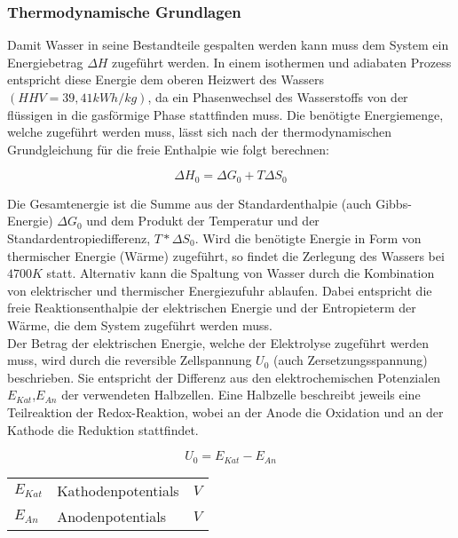 \documentclass[onecolumn,10pt,titlepage]{article}
\begin{document}
\subsubsection{Thermodynamische Grundlagen}
\label{subsub_thermodynGrundL}
Damit Wasser in seine Bestandteile gespalten werden kann muss dem System ein Energiebetrag $\Delta H$ zugeführt werden.\cite{Jung} In einem isothermen und adiabaten Prozess entspricht diese Energie dem oberen Heizwert des Wassers $(HHV=39,41kWh/kg)$, da ein Phasenwechsel des Wasserstoffs von der flüssigen in die gasförmige Phase stattfinden muss. Die benötigte Energiemenge, welche zugeführt werden muss, lässt sich nach der thermodynamischen Grundgleichung für die freie Enthalpie wie folgt berechnen:

\begin{equation}
\Delta H_0 = \Delta G_0 + T\Delta S_0
\end{equation}

Die Gesamtenergie ist die Summe aus der Standardenthalpie (auch Gibbs-Energie) $\Delta G_0$ und dem Produkt der Temperatur und der Standardentropiedifferenz, $T * \Delta S_0$. Wird die benötigte Energie in Form von thermischer Energie (Wärme) zugeführt, so findet die Zerlegung des Wassers bei $4700K$ statt. Alternativ kann die Spaltung von Wasser durch die Kombination von elektrischer und thermischer Energiezufuhr ablaufen. Dabei entspricht die freie Reaktionsenthalpie der elektrischen Energie und der Entropieterm der Wärme, die dem System zugeführt werden muss.\\

Der Betrag der elektrischen Energie, welche der Elektrolyse zugeführt werden muss, wird durch die reversible Zellspannung $U_0$ (auch Zersetzungsspannung) beschrieben.\cite{Hey.26.Oktober2012} Sie entspricht der Differenz aus den elektrochemischen Potenzialen $E_{Kat}$,$E_{An}$ der verwendeten Halbzellen. Eine Halbzelle beschreibt jeweils eine Teilreaktion der Redox-Reaktion, wobei an der Anode die Oxidation und an der Kathode die Reduktion stattfindet.

\begin{equation}
	U_0 = E_{Kat} - E_{An}
	\label{eq:Teilreakt}
\end{equation}

\begin{table}[H]
	\begin{tabular*}{\textwidth}{lll}\\
		$E_{Kat}$&Kathodenpotentials&$V$\\
		$E_{An}$&Anodenpotentials&$V$\\
		
	\end{tabular*}
\end{table}
\end{document}
